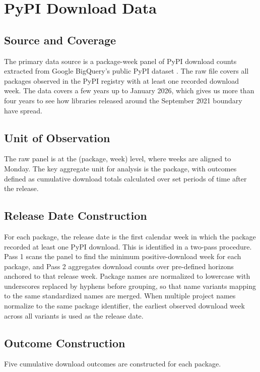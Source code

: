 \documentclass[12pt, a4paper]{report}
\begin{document}
\section{PyPI Download Data}\label{sec:data-pypi}
\subsection{Source and Coverage}
The primary data source is a package-week panel of PyPI download counts extracted from Google BigQuery's public PyPI dataset \citep{pypi2024stats}. The raw file covers all packages observed in the PyPI registry with at least one recorded download week. The data covers a few years up to January 2026, which gives us more than four years to see how libraries released around the September 2021 boundary have spread.

\subsection{Unit of Observation}
The raw panel is at the (package, week) level, where weeks are aligned to Monday. The key aggregate unit for analysis is the package, with outcomes defined as cumulative download totals calculated over set periods of time after the release.

\subsection{Release Date Construction}
For each package, the release date is the first calendar week in which the package recorded at least one PyPI download. This is identified in a two-pass procedure. Pass 1 scans the panel to find the minimum positive-download week for each package, and Pass 2 aggregates download counts over pre-defined horizons anchored to that release week. Package names are normalized to lowercase with underscores replaced by hyphens before grouping, so that name variants mapping to the same standardized names are merged. When multiple project names normalize to the same package identifier, the earliest observed download week across all variants is used as the release date.

\subsection{Outcome Construction}
Five cumulative download outcomes are constructed for each package.
\end{document}
